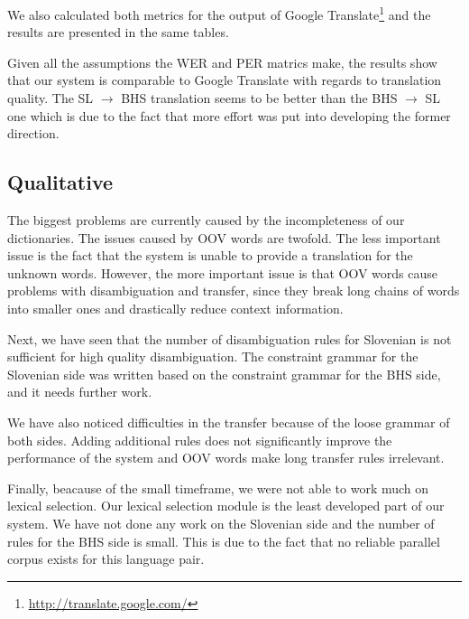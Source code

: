 We also calculated both metrics for the output of Google Translate\footnote{\url{http://translate.google.com/}} 
and the results are presented in the same tables. 

Given all the assumptions the WER and PER matrics make, the results show that our system is comparable to Google Translate
with regards to translation quality. The SL $\rightarrow$ BHS translation seems to be better than the BHS $\rightarrow$ SL one
which is due to the fact that more effort was put into developing the former direction.



\subsection{Qualitative}
The biggest problems are currently caused by the incompleteness of our dictionaries.
The issues caused by OOV words are twofold.
The less important issue is the fact that the system is unable to provide a translation for the unknown words. 
However, the more important issue is that OOV words cause problems with disambiguation and transfer, since they
break long chains of words into smaller ones and drastically reduce context information. 

Next, we have seen that the number of disambiguation rules for Slovenian is not sufficient for high quality disambiguation. 
The constraint grammar for the Slovenian side was written based on the constraint grammar for the BHS side,
and it needs further work.

We have also noticed difficulties in the transfer because of the loose grammar of both sides.
Adding additional rules does not significantly improve the performance of the system 
and OOV words make long transfer rules irrelevant.

Finally, beacause of the small timeframe, we were not able to work much on lexical selection.
Our lexical selection module is the least developed part of our system. 
We have not done any work on the Slovenian side and the number of rules for the BHS side is small.
This is due to the fact that no reliable parallel corpus exists for this language pair.



